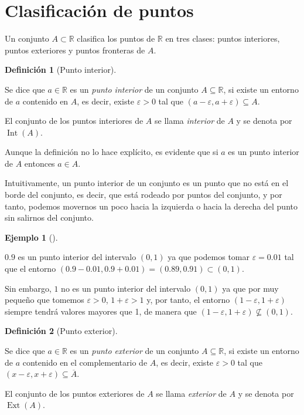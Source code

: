 \documentclass[
  a4paper,
]{scrreport}
\theoremstyle{definition}
\newtheorem{example}{Ejemplo}[chapter]
\theoremstyle{plain}
\theoremstyle{definition}
\newtheorem{definition}{Definición}[chapter]
\theoremstyle{definition}
\theoremstyle{plain}
\theoremstyle{plain}
\theoremstyle{remark}
\begin{document}
\section{Clasificación de puntos}\label{clasificaciuxf3n-de-puntos}

Un conjunto \(A\subset \mathbb{R}\) clasifica los puntos de
\(\mathbb{R}\) en tres clases: puntos interiores, puntos exteriores y
puntos fronteras de \(A\).

\begin{definition}[Punto
interior]\protect\hypertarget{def-punto-interior}{}\label{def-punto-interior}

Se dice que \(a\in \mathbb{R}\) es un \emph{punto interior} de un
conjunto \(A\subseteq \mathbb{R}\), si existe un entorno de \(a\)
contenido en \(A\), es decir, existe \(\varepsilon>0\) tal que
\((a-\varepsilon, a+\varepsilon) \subseteq A\).

El conjunto de los puntos interiores de \(A\) se llama \emph{interior}
de \(A\) y se denota por \(\operatorname{Int}(A)\).

\end{definition}

Aunque la definición no lo hace explícito, es evidente que si \(a\) es
un punto interior de \(A\) entonces \(a\in A\).

Intuitivamente, un punto interior de un conjunto es un punto que no está
en el borde del conjunto, es decir, que está rodeado por puntos del
conjunto, y por tanto, podemos movernos un poco hacia la izquierda o
hacia la derecha del punto sin salirnos del conjunto.

\begin{example}[]\protect\hypertarget{exm-punto-interior}{}\label{exm-punto-interior}

\(0.9\) es un punto interior del intervalo \((0,1)\) ya que podemos
tomar \(\varepsilon = 0.01\) tal que el entorno
\((0.9-0.01,0.9+0.01) = (0.89, 0.91)\subset (0,1)\).

Sin embargo, \(1\) no es un punto interior del intervalo \((0,1)\) ya
que por muy pequeño que tomemos \(\varepsilon>0\), \(1+\varepsilon > 1\)
y, por tanto, el entorno \((1-\varepsilon, 1+\varepsilon)\) siempre
tendrá valores mayores que 1, de manera que
\((1-\varepsilon, 1+\varepsilon)\not \subseteq (0,1)\).

\end{example}

\begin{definition}[Punto
exterior]\protect\hypertarget{def-punto-exterior}{}\label{def-punto-exterior}

Se dice que \(a\in \mathbb{R}\) es un \emph{punto exterior} de un
conjunto \(A\subseteq \mathbb{R}\), si existe un entorno de \(a\)
contenido en el complementario de \(A\), es decir, existe
\(\varepsilon>0\) tal que
\((x-\varepsilon, x+\varepsilon) \subseteq \overline A\).

El conjunto de los puntos exteriores de \(A\) se llama \emph{exterior}
de \(A\) y se denota por \(\operatorname{Ext}(A)\).

\end{definition}
\end{document}
